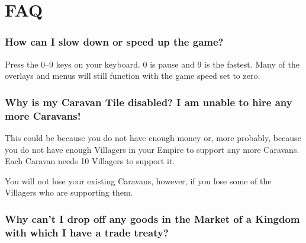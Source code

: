 
\chapter{FAQ}



\subsection{How can I slow down or speed up the game?}

Press the 0--9 keys on your keyboard. 0 is pause and 9 is the fastest. Many of the overlays and menus will still function with the game speed set to zero.

\subsection{Why is my Caravan Tile disabled? I am unable to hire any more Caravans!}

This could be because you do not have enough money or, more probably, because you do not have enough Villagers in your Empire to support any more Caravans. Each Caravan needs 10 Villagers to support it.

You will not lose your existing Caravans, however, if you lose some of the Villagers who are supporting them.

\subsection{Why can’t I drop off any goods in the Market of a Kingdom with which I have a trade treaty?}

